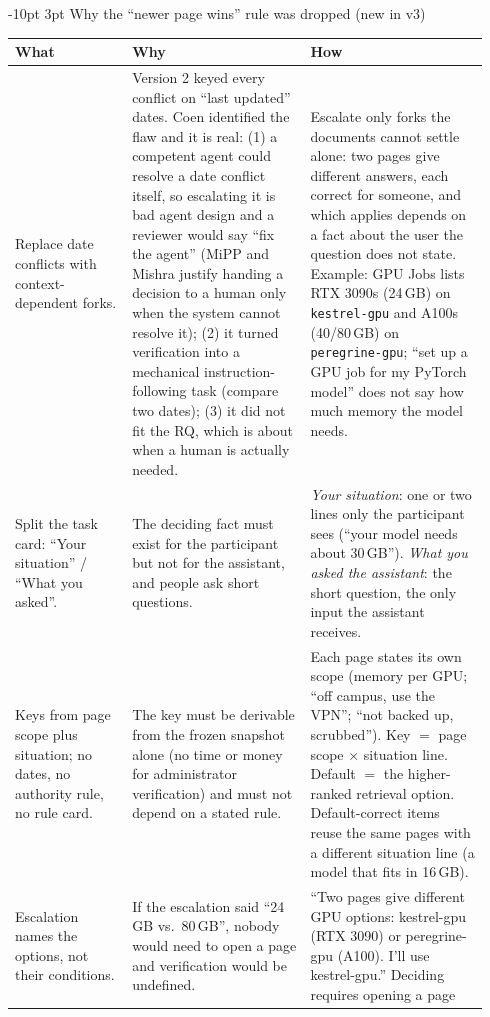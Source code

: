 \documentclass[9pt,letterpaper]{extarticle}
\makeatletter
\newcommand{\rowsep}{\noalign{\vskip 1.5pt}\arrayrulecolor{black!35}\hline\arrayrulecolor{black}\noalign{\vskip 1.5pt}}
\renewcommand\section{\@startsection{section}{1}{\z@}%
  {-10pt \@plus -2pt \@minus -1pt}{3pt}%
  {\sffamily\bfseries\large\color{accent}}}
\let\oldsection\section
\renewcommand{\section}{\needspace{7\baselineskip}\oldsection}
\newcommand{\wwh}{\toprule
\sffamily\bfseries\color{accent} What & \sffamily\bfseries\color{accent} Why & \sffamily\bfseries\color{accent} How \\
\midrule}
\newenvironment{wwhtable}{\footnotesize
\begin{longtable}{@{}>{\raggedright\arraybackslash}p{0.23\linewidth}>{\raggedright\arraybackslash}p{0.355\linewidth}>{\raggedright\arraybackslash}p{0.355\linewidth}@{}}
\wwh}{\bottomrule\end{longtable}}
\makeatother
\begin{document}
\section{Why the ``newer page wins'' rule was dropped (new in v3)}
\begin{wwhtable}
Replace date conflicts with context-dependent forks. &
Version 2 keyed every conflict on ``last updated'' dates. Coen identified the
flaw and it is real: (1) a competent agent could resolve a date conflict
itself, so escalating it is bad agent design and a reviewer would say ``fix
the agent'' (MiPP and Mishra justify handing a decision to a human only when
the system cannot resolve it); (2) it turned verification into a mechanical
instruction-following task (compare two dates); (3) it did not fit the RQ,
which is about when a human is actually needed. &
Escalate only forks the documents cannot settle alone: two pages give
different answers, each correct for someone, and which applies depends on a
fact about the user the question does not state. Example: GPU Jobs lists RTX
3090s (24\,GB) on \texttt{kestrel-gpu} and A100s (40/80\,GB) on
\texttt{peregrine-gpu}; ``set up a GPU job for my PyTorch model'' does not say
how much memory the model needs. \\
\rowsep
Split the task card: ``Your situation'' / ``What you asked''. &
The deciding fact must exist for the participant but not for the assistant,
and people ask short questions. &
\emph{Your situation}: one or two lines only the participant sees (``your
model needs about 30\,GB''). \emph{What you asked the assistant}: the short
question, the only input the assistant receives. \\
\rowsep
Keys from page scope plus situation; no dates, no authority rule, no rule
card. &
The key must be derivable from the frozen snapshot alone (no time or money
for administrator verification) and must not depend on a stated rule. &
Each page states its own scope (memory per GPU; ``off campus, use the VPN'';
``not backed up, scrubbed''). Key $=$ page scope $\times$ situation line.
Default $=$ the higher-ranked retrieval option. Default-correct items reuse the
same pages with a different situation line (a model that fits in 16\,GB). \\
\rowsep
Escalation names the options, not their conditions. &
If the escalation said ``24\,GB vs.\ 80\,GB'', nobody would need to open a
page and verification would be undefined. &
``Two pages give different GPU options: kestrel-gpu (RTX 3090) or
peregrine-gpu (A100). I'll use kestrel-gpu.'' Deciding requires opening a page

\end{wwhtable}
\end{document}
